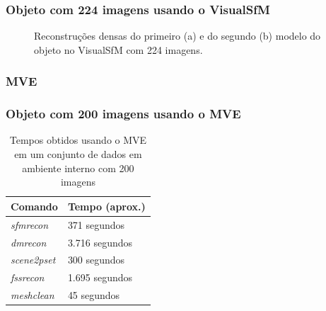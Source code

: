 \documentclass[table, usenames, svgnames, xcolor=dvipsnames]{beamer}
\begin{document}
\begin{frame}
\frametitle{\textbf{Objeto com 224 imagens usando o VisualSfM}}
	\begin{figure}[!h]
		\centering
		\caption{Reconstruções densas do primeiro (a) e do segundo (b) modelo do objeto no VisualSfM com 224 imagens.
		}
	\end{figure}
\end{frame}
\subsubsection{MVE}

\begin{frame}
\frametitle{\textbf{Objeto com 200 imagens usando o MVE}}
	\begin{table}[!h]
	\centering
	\caption{Tempos obtidos usando o MVE em um conjunto de dados em ambiente interno com 200 imagens}
	\label{tab:galinha200mve}
		\begin{tabular}{|l|l|}
			\hline
			Comando            & Tempo (aprox.)         \\ \hline
			\emph{sfmrecon}  & 371 segundos   \\ \hline
			\emph{dmrecon}   & 3.716 segundos \\ \hline
			\emph{scene2pset} & 300 segundos   \\ \hline
			\emph{fssrecon}  & 1.695 segundos \\ \hline
			\emph{meshclean} & 45 segundos    \\ \hline
		\end{tabular}
	\end{table}	
\end{frame}
\end{document}

